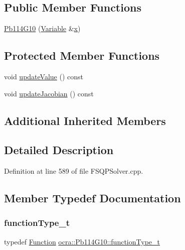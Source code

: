 \subsection*{Public Member Functions}
\begin{DoxyCompactItemize}
\item 
\hyperlink{classocra_1_1Pb114G10_a3a99a728ba252d05dd70b24d39dfb643}{Pb114\+G10} (\hyperlink{classocra_1_1Variable}{Variable} \&\hyperlink{classocra_1_1Function_a28825886d1f149c87b112ec2ec1dd486}{x})
\end{DoxyCompactItemize}
\subsection*{Protected Member Functions}
\begin{DoxyCompactItemize}
\item 
void \hyperlink{classocra_1_1Pb114G10_a8bdb81b11c37543a833cd09b199d9a1c}{update\+Value} () const
\item 
void \hyperlink{classocra_1_1Pb114G10_aab79b71d5356edb0cd551158bb9bb93b}{update\+Jacobian} () const
\end{DoxyCompactItemize}
\subsection*{Additional Inherited Members}


\subsection{Detailed Description}


Definition at line 589 of file F\+S\+Q\+P\+Solver.\+cpp.



\subsection{Member Typedef Documentation}
\hypertarget{classocra_1_1Pb114G10_abefa27aa6362ee95d59c39654bd7ab2f}{}\label{classocra_1_1Pb114G10_abefa27aa6362ee95d59c39654bd7ab2f} 
\subsubsection{\texorpdfstring{function\+Type\+\_\+t}{functionType\_t}}
{\footnotesize\ttfamily typedef \hyperlink{classocra_1_1Function}{Function} \hyperlink{classocra_1_1Pb114G10_abefa27aa6362ee95d59c39654bd7ab2f}{ocra\+::\+Pb114\+G10\+::function\+Type\+\_\+t}}



